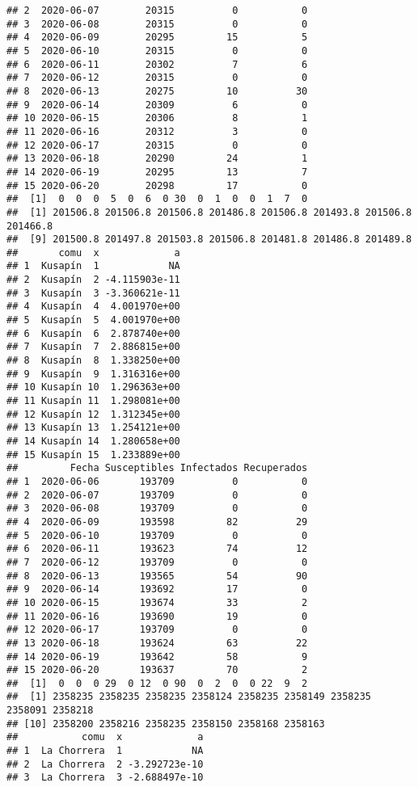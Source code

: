 \documentclass[
]{article}
\begin{document}
\begin{verbatim}
## 2  2020-06-07        20315          0           0
## 3  2020-06-08        20315          0           0
## 4  2020-06-09        20295         15           5
## 5  2020-06-10        20315          0           0
## 6  2020-06-11        20302          7           6
## 7  2020-06-12        20315          0           0
## 8  2020-06-13        20275         10          30
## 9  2020-06-14        20309          6           0
## 10 2020-06-15        20306          8           1
## 11 2020-06-16        20312          3           0
## 12 2020-06-17        20315          0           0
## 13 2020-06-18        20290         24           1
## 14 2020-06-19        20295         13           7
## 15 2020-06-20        20298         17           0
##  [1]  0  0  0  5  0  6  0 30  0  1  0  0  1  7  0
##  [1] 201506.8 201506.8 201506.8 201486.8 201506.8 201493.8 201506.8 201466.8
##  [9] 201500.8 201497.8 201503.8 201506.8 201481.8 201486.8 201489.8
##       comu  x             a
## 1  Kusapín  1            NA
## 2  Kusapín  2 -4.115903e-11
## 3  Kusapín  3 -3.360621e-11
## 4  Kusapín  4  4.001970e+00
## 5  Kusapín  5  4.001970e+00
## 6  Kusapín  6  2.878740e+00
## 7  Kusapín  7  2.886815e+00
## 8  Kusapín  8  1.338250e+00
## 9  Kusapín  9  1.316316e+00
## 10 Kusapín 10  1.296363e+00
## 11 Kusapín 11  1.298081e+00
## 12 Kusapín 12  1.312345e+00
## 13 Kusapín 13  1.254121e+00
## 14 Kusapín 14  1.280658e+00
## 15 Kusapín 15  1.233889e+00
##         Fecha Susceptibles Infectados Recuperados
## 1  2020-06-06       193709          0           0
## 2  2020-06-07       193709          0           0
## 3  2020-06-08       193709          0           0
## 4  2020-06-09       193598         82          29
## 5  2020-06-10       193709          0           0
## 6  2020-06-11       193623         74          12
## 7  2020-06-12       193709          0           0
## 8  2020-06-13       193565         54          90
## 9  2020-06-14       193692         17           0
## 10 2020-06-15       193674         33           2
## 11 2020-06-16       193690         19           0
## 12 2020-06-17       193709          0           0
## 13 2020-06-18       193624         63          22
## 14 2020-06-19       193642         58           9
## 15 2020-06-20       193637         70           2
##  [1]  0  0  0 29  0 12  0 90  0  2  0  0 22  9  2
##  [1] 2358235 2358235 2358235 2358124 2358235 2358149 2358235 2358091 2358218
## [10] 2358200 2358216 2358235 2358150 2358168 2358163
##           comu  x             a
## 1  La Chorrera  1            NA
## 2  La Chorrera  2 -3.292723e-10
## 3  La Chorrera  3 -2.688497e-10

\end{verbatim}
\end{document}
